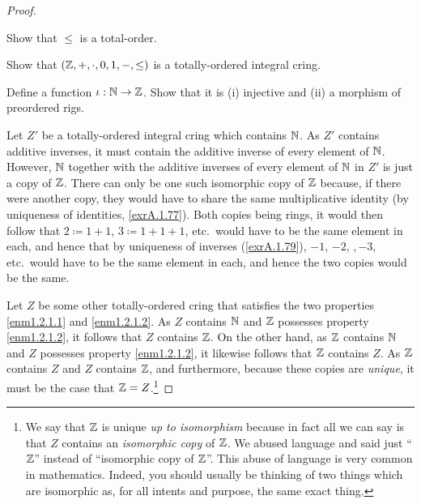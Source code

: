\begin{thm}[Integers]
\begin{proof}
\begin{exr}
Show that $\leq$ is a total-order.
\end{exr}

\begin{exr}
Show that $(\mathbb{Z} ,+,\cdot ,0,1,-,\leq )$ is a totally-ordered integral cring.
\end{exr}

\begin{exr}
Define a function $\iota :\mathbb{N} \rightarrow \mathbb{Z}$.  Show that it is (i) injective and (ii) a morphism of preordered rigs.
\end{exr}

Let $Z'$ be a totally-ordered integral cring which contains $\mathbb{N}$.  As $Z'$ contains additive inverses, it must contain the additive inverse of every element of $\mathbb{N}$.  However, $\mathbb{N}$ together with the additive inverses of every element of $\mathbb{N}$ in $Z'$ is just a copy of $\mathbb{Z}$.  There can only be one such isomorphic copy of $\mathbb{Z}$ because, if there were another copy, they would have to share the same multiplicative identity (by uniqueness of identities, \cref{exrA.1.77}).  Both copies being rings, it would then follow that $2\coloneqq 1+1$, $3\coloneqq 1+1+1$, etc.~would have to be the same element in each, and hence that by uniqueness of inverses (\cref{exrA.1.79}), $-1$, $-2$, $,-3$, etc.~would have to be the same element in each, and hence the two copies would be the same.

Let $Z$ be some other totally-ordered cring that satisfies the two properties \ref{enm1.2.1.1} and \ref{enm1.2.1.2}.  As $Z$ contains $\mathbb{N}$ and $\mathbb{Z}$ possesses property \ref{enm1.2.1.2}, it follows that $Z$ contains $\mathbb{Z}$.  On the other hand, as $\mathbb{Z}$ contains $\mathbb{N}$ and $Z$ possesses property \ref{enm1.2.1.2}, it likewise follows that $\mathbb{Z}$ contains $Z$.  As $\mathbb{Z}$ contains $Z$ and $Z$ contains $\mathbb{Z}$, and furthermore, because these copies are \emph{unique}, it must be the case that $\mathbb{Z} =Z$.\footnote{We say that $\mathbb{Z}$ is unique \emph{up to isomorphism} because in fact all we can say is that $Z$ contains an \emph{isomorphic copy} of $\mathbb{Z}$.  We abused language and said just ``$\mathbb{Z}$'' instead of ``isomorphic copy of $\mathbb{Z}$''.  This abuse of language is very common in mathematics.  Indeed, you should usually be thinking of two things which are isomorphic as, for all intents and purpose, the same exact thing.}
\end{proof}
\end{thm}

